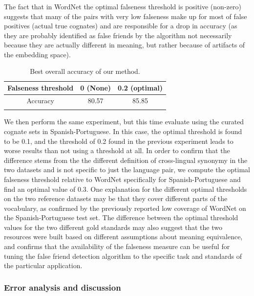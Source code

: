 \documentclass[output=paper]{langsci/langscibook}
\begin{document}
The fact that in WordNet the optimal falseness threshold is positive (non-zero) suggests that many of the pairs with very low falseness make up for most of false positives (actual true cognates) and are responsible for a drop in accuracy (as they are probably identified as false friends by the algorithm not necessarily because they are actually different in meaning, but rather because of artifacts of the embedding space).

\begin{table}[!h]
    \centering
    \begin{tabular}{c c c}
\lsptoprule
Falseness threshold & 0 (None) & 0.2 (optimal) \\
\midrule
Accuracy & 80.57 & 85.85 \\
\lspbottomrule
    \end{tabular}
    \caption{Best overall accuracy of our method.}
    \label{tab:overall_acc}
\end{table}

We then perform the same experiment, but this time evaluate using the curated cognate sets in Spanish-Portuguese. In this case, the optimal threshold is found to be 0.1, and the threshold of 0.2 found in the previous experiment leads to worse results than not using a threshold at all. In order to confirm that the difference stems from the the different definition of cross-lingual synonymy in the two datasets and is not specific to just the language pair, we compute the optimal falseness threshold relative to WordNet specifically for Spanish-Portuguese and find an optimal value of 0.3. One explanation for the different optimal thresholds on the two reference datasets may be that they cover different parts of the vocabulary, as confirmed by the previously reported low coverage of WordNet on the Spanish-Portuguese test set. The difference between the optimal threshold values for the two different gold standards may also suggest that the two resources were built based on different assumptions about meaning equivalence, and confirms that the availability of the falseness measure can be useful for tuning the false friend detection algorithm to the specific task and standards of the particular application.

\subsubsection{Error analysis and discussion}
\end{document}
